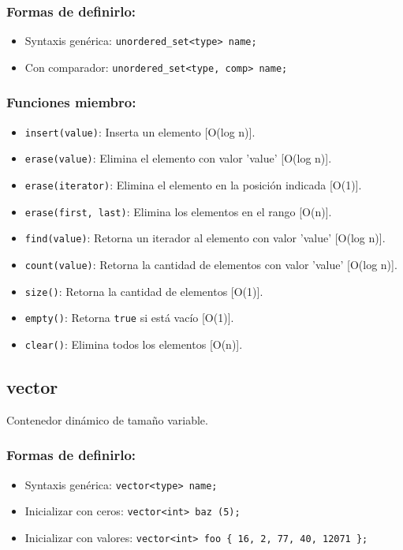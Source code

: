 \subsubsection{Formas de definirlo:}
\begin{itemize}
  \item Syntaxis genérica: \texttt{unordered\_set<type> name;}
  \item Con comparador: \texttt{unordered\_set<type, comp> name;}
\end{itemize}

\subsubsection{Funciones miembro:}
\begin{itemize}
  \item \texttt{insert(value)}: Inserta un elemento [O(log n)]. 
  \item \texttt{erase(value)}: Elimina el elemento con valor 'value' [O(log n)].
  \item \texttt{erase(iterator)}: Elimina el elemento en la posición indicada [O(1)].
  \item \texttt{erase(first, last)}: Elimina los elementos en el rango [O(n)].
  \item \texttt{find(value)}: Retorna un iterador al elemento con valor 'value' [O(log n)]. 
  \item \texttt{count(value)}: Retorna la cantidad de elementos con valor 'value' [O(log n)]. 
  \item \texttt{size()}: Retorna la cantidad de elementos [O(1)]. 
  \item \texttt{empty()}: Retorna \texttt{true} si está vacío [O(1)]. 
  \item \texttt{clear()}: Elimina todos los elementos [O(n)]. 
\end{itemize}

\subsection{vector}
\label{subsec:std_vector}
Contenedor dinámico de tamaño variable.

\subsubsection{Formas de definirlo:}
\begin{itemize}
  \item Syntaxis genérica: \texttt{vector<type> name;}
  \item Inicializar con ceros: \texttt{vector<int> baz (5);}
  \item Inicializar con valores: \texttt{vector<int> foo \{ 16, 2, 77, 40, 12071 \};}
\end{itemize}


